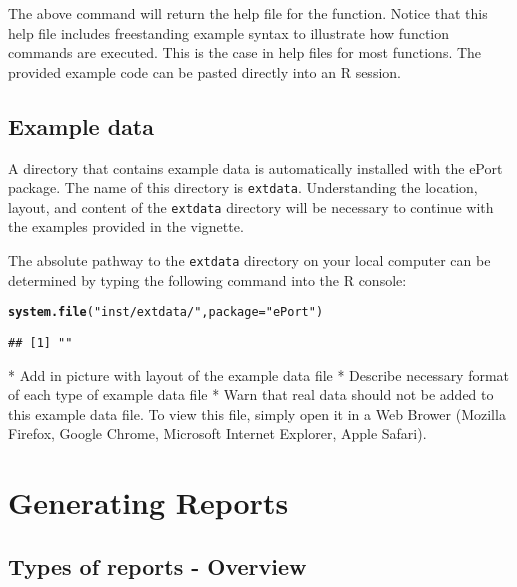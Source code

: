 \documentclass{article}\usepackage[]{graphicx}\usepackage[]{color}
\makeatletter
\newcommand{\hlstr}[1]{\textcolor[rgb]{0.192,0.494,0.8}{#1}}%
\newcommand{\hlstd}[1]{\textcolor[rgb]{0.345,0.345,0.345}{#1}}%
\newcommand{\hlkwc}[1]{\textcolor[rgb]{0.333,0.667,0.333}{#1}}%
\newcommand{\hlkwd}[1]{\textcolor[rgb]{0.737,0.353,0.396}{\textbf{#1}}}%
\newenvironment{kframe}{%
 \def\at@end@of@kframe{}%
 \ifinner\ifhmode%
  \def\at@end@of@kframe{\end{minipage}}%
  \begin{minipage}{\columnwidth}%
 \fi\fi%
 \def\FrameCommand##1{\hskip\@totalleftmargin \hskip-\fboxsep
 \colorbox{shadecolor}{##1}\hskip-\fboxsep
     \hskip-\linewidth \hskip-\@totalleftmargin \hskip\columnwidth}%
 \MakeFramed {\advance\hsize-\width
   \@totalleftmargin\z@ \linewidth\hsize
   \@setminipage}}%
 {\par\unskip\endMakeFramed%
 \at@end@of@kframe}
\newenvironment{knitrout}{}{} %
\numberwithin{equation}{section} %
\newcommand{\R}{{\normalfont\textsf{R }}{}}
\makeatother
\begin{document}
The above command will return the help file for the function. Notice that this help file includes freestanding example syntax to illustrate how function commands are executed. This is the case in help files for most functions. The provided example code can be pasted directly into an \R session.

\subsection{Example data}

A directory that contains example data is automatically installed with the ePort package. The name of this directory is \texttt{extdata}. Understanding the location, layout, and content of the \texttt{extdata} directory will be necessary to continue with the examples provided in the vignette.

The absolute pathway to the \texttt{extdata} directory on your local computer can be determined by typing the following command into the R console:

\begin{knitrout}
\color{fgcolor}\begin{kframe}
\begin{alltt}
\hlkwd{system.file}\hlstd{(}\hlstr{"inst/extdata/"}\hlstd{,} \hlkwc{package}\hlstd{=}\hlstr{"ePort"}\hlstd{)}
\end{alltt}
\begin{verbatim}
## [1] ""
\end{verbatim}
\end{kframe}
\end{knitrout}

* Add in picture with layout of the example data file  
* Describe necessary format of each type of example data file  
* Warn that real data should not be added to this example data file.
To view this file, simply open it in a Web Brower (Mozilla Firefox, Google Chrome, Microsoft Internet Explorer, Apple Safari).  

\section{Generating Reports}

\subsection{Types of reports - Overview}
\end{document}
